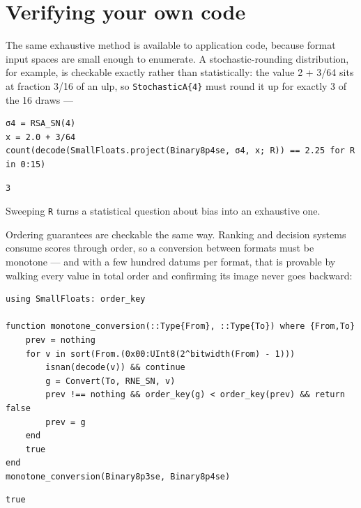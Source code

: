 \section{Verifying your own code}



\label{12572045495842974798}{}


The same exhaustive method is available to application code, because format input spaces are small enough to enumerate. A stochastic-rounding distribution, for example, is checkable exactly rather than statistically: the value 2 + 3/64 sits at fraction 3/16 of an ulp, so \texttt{StochasticA\{4\}} must round it up for exactly 3 of the 16 draws —




\begin{verbatim}
σ4 = RSA_SN(4)
x = 2.0 + 3/64
count(decode(SmallFloats.project(Binary8p4se, σ4, x; R)) == 2.25 for R in 0:15)
\end{verbatim}




\begin{verbatim}
3
\end{verbatim}



Sweeping \texttt{R} turns a statistical question about bias into an exhaustive one.



Ordering guarantees are checkable the same way. Ranking and decision systems consume scores through order, so a conversion between formats must be monotone — and with a few hundred datums per format, that is provable by walking every value in total order and confirming its image never goes backward:




\begin{verbatim}
using SmallFloats: order_key

function monotone_conversion(::Type{From}, ::Type{To}) where {From,To}
    prev = nothing
    for v in sort(From.(0x00:UInt8(2^bitwidth(From) - 1)))
        isnan(decode(v)) && continue
        g = Convert(To, RNE_SN, v)
        prev !== nothing && order_key(g) < order_key(prev) && return false
        prev = g
    end
    true
end
monotone_conversion(Binary8p3se, Binary8p4se)
\end{verbatim}




\begin{verbatim}
true
\end{verbatim}



